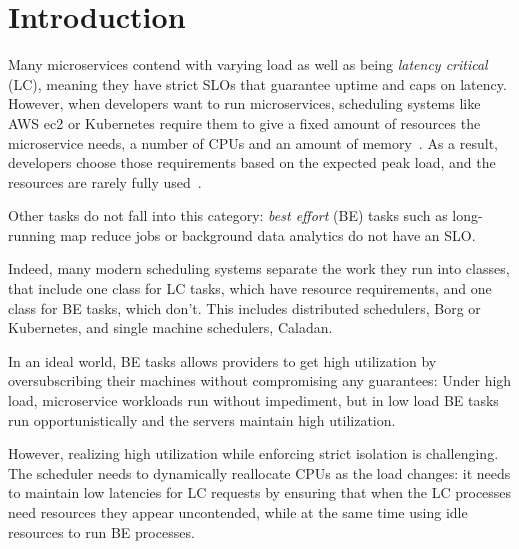 \section{Introduction}
\label{s:intro}

Many microservices contend with varying load as well as being \textit{latency
critical} (LC), meaning they have strict SLOs that guarantee uptime and caps on
latency. However, when developers want to run microservices, scheduling systems
like AWS ec2 or Kubernetes require them to give a fixed amount of resources the
microservice needs, \ie{} a number of CPUs and an amount of
memory~\cite{aws-ec2-resources, kubernetes-resources}. As a result, developers
choose those requirements based on the expected peak load, and the resources are
rarely fully used~\cite{borg, nu, overprovision}.

Other tasks do not fall into this category: \textit{best effort} (BE) tasks such
as long-running map reduce jobs or background data analytics do not have an SLO.

Indeed, many modern scheduling systems separate the work they run into classes,
that include one class for LC tasks, which have resource requirements, and one
class for BE tasks, which don't. This includes distributed schedulers, \eg{}
Borg\cite{borg} or Kubernetes\cite{kubernetes-resources}, and single machine
schedulers, \eg{} Caladan\cite{caladan}.

In an ideal world, BE tasks allows providers to get high utilization by
oversubscribing their machines without compromising any guarantees: Under high
load, microservice workloads run without impediment, but in low load BE tasks
run opportunistically and the servers maintain high utilization.

However, realizing high utilization while enforcing strict isolation is
challenging. The scheduler needs to dynamically reallocate CPUs as the load
changes: it needs to maintain low latencies for LC requests by ensuring that
when the LC processes need resources they appear uncontended, while at the same
time using idle resources to run BE processes.


